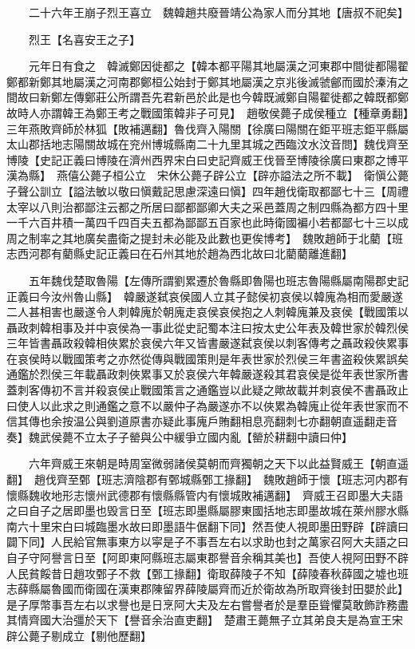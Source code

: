 　　二十六年王崩子烈王喜立　魏韓趙共廢晉靖公為家人而分其地【唐叔不祀矣】

　　烈王【名喜安王之子】

　　元年日有食之　韓滅鄭因徙都之【韓本都平陽其地屬漢之河東郡中間徙都陽翟鄭都新鄭其地屬漢之河南郡鄭桓公始封于鄭其地屬漢之京兆後滅虢鄶而國於溱洧之間故曰新鄭左傳鄭莊公所謂吾先君新邑於此是也今韓既滅鄭自陽翟徙都之韓既都鄭故時人亦謂韓王為鄭王考之戰國策韓非子可見】　趙敬侯薨子成侯種立【種章勇翻】三年燕敗齊師於林狐【敗補邁翻】魯伐齊入陽關【徐廣曰陽關在鉅平班志鉅平縣屬太山郡括地志陽關故城在兖州博城縣南二十九里其城之西臨汶水汶音問】魏伐齊至博陵【史記正義曰博陵在濟州西界宋白曰史記齊威王伐晉至博陵徐廣曰東郡之博平漢為縣】　燕僖公薨子桓公立　宋休公薨子辟公立【辟亦謚法之所不載】　衛愼公薨子聲公訓立【謚法敏以敬曰愼戴記思慮深遠曰愼】四年趙伐衛取都鄙七十三【周禮太宰以八則治都鄙注云都之所居曰鄙都鄙卿大夫之采邑蓋周之制四縣為都方四十里一千六百井積一萬四千四百夫五都為鄙鄙五百家也此時衛國褊小若都鄙七十三以成周之制率之其地廣矣盡衛之提封未必能及此數也更俟博考】　魏敗趙師于北藺【班志西河郡有藺縣史記正義曰在石州其地於趙為西北故曰北藺藺離進翻】

　　五年魏伐楚取魯陽【左傳所謂劉累遷於魯縣即魯陽也班志魯陽縣屬南陽郡史記正義曰今汝州魯山縣】　韓嚴遂弑哀侯國人立其子懿侯初哀侯以韓廆為相而愛嚴遂二人甚相害也嚴遂令人刺韓廆於朝廆走哀侯哀侯抱之人刺韓廆兼及哀侯【戰國策以聶政刺韓相事及并中哀侯為一事此從史記蜀本注曰按太史公年表及韓世家於韓烈侯三年皆書聶政殺韓相俠累於哀侯六年又皆書嚴遂弑哀侯以刺客傳考之聶政殺俠累事在哀侯時以戰國策考之亦然從傳與戰國策則是年表世家於烈侯三年書盗殺俠累誤矣通鑑於烈侯三年載聶政刺俠累事又於哀侯六年韓嚴遂殺其君哀侯是從年表世家所書蓋刺客傳初不言并殺哀侯止戰國策言之通鑑豈以此疑之歟故載并刺哀侯不書聶政止曰使人以此求之則通鑑之意不以嚴仲子為嚴遂亦不以俠累為韓廆止從年表世家而不信其傳也余按温公與劉道原書亦疑此事廆戶賄翻相息亮翻刺七亦翻朝直遥翻走音奏】魏武侯薨不立太子子罃與公中緩爭立國内亂【罃於耕翻中讀曰仲】

　　六年齊威王來朝是時周室微弱諸侯莫朝而齊獨朝之天下以此益賢威王【朝直遥翻】　趙伐齊至鄄【班志濟陰郡有鄄城縣鄄工掾翻】　魏敗趙師于懷【班志河内郡有懷縣魏收地形志懷州武德郡有懷縣縣管内有懷城敗補邁翻】　齊威王召即墨大夫語之曰自子之居即墨也毁言日至【班志即墨縣屬膠東國括地志即墨故城在萊州膠水縣南六十里宋白曰城臨墨水故曰即墨語牛倨翻下同】然吾使人視即墨田野辟【辟讀曰闢下同】人民給官無事東方以寜是子不事吾左右以求助也封之萬家召阿大夫語之曰自子守阿譽言日至【阿即東阿縣班志屬東郡譽音余稱其美也】吾使人視阿田野不辟人民貧餒昔日趙攻鄄子不救【鄄工掾翻】衛取薛陵子不知【薛陵春秋薛國之墟也班志薛縣屬魯國而衛國在漢東郡陳留界薛陵屬齊而近於衛故為所取齊後封田嬰於此】是子厚幣事吾左右以求譽也是日烹阿大夫及左右嘗譽者於是羣臣聳懼莫敢飾詐務盡其情齊國大治彊於天下【譽音余治直吏翻】　楚肅王薨無子立其弟良夫是為宣王宋辟公薨子剔成立【剔他歷翻】

